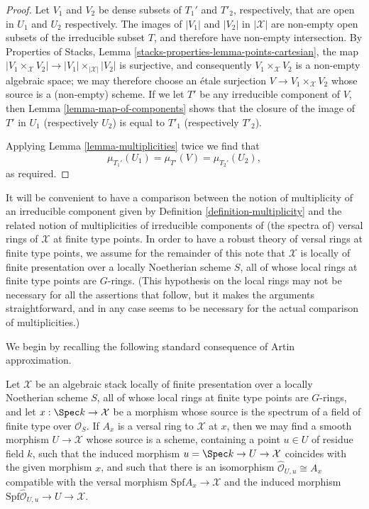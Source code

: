 \begin{proof}
Let $V_1$ and $V_2$ be dense subsets of $T_1'$ and $T'_2$, respectively,
that are open in $U_1$ and $U_2$ respectively.
The images of $|V_1|$ and $|V_2|$ in $|\mathcal{X}|$ are non-empty open
subsets of the irreducible subset $T$, and therefore have non-empty
intersection.
By Properties of Stacks, Lemma \ref{stacks-properties-lemma-points-cartesian},
the map $|V_1\times_\mathcal{X} V_2|\to
|V_1|\times_{|\mathcal{X}|}|V_2|$ is surjective,
and consequently $V_1\times_{\mathcal{X}} V_2$ is a non-empty algebraic
space; we may therefore choose an \'etale surjection
$V \to V_1\times_{\mathcal{X}} V_2$ whose source is a (non-empty) scheme.
If we let $T'$ be any irreducible component of $V$,
then Lemma \ref{lemma-map-of-components} shows that the closure of
the image of $T'$ in $U_1$ (respectively $U_2$) is equal to $T'_1$
(respectively $T'_2$).

\medskip\noindent
Applying
Lemma \ref{lemma-multiplicities} twice we find
that
$$
\mu_{T_1'}(U_1)=\mu_{T'}(V)=\mu_{T_2'}(U_2),
$$
as required.
\end{proof}

\noindent
It will be convenient to have a comparison between the notion of multiplicity
of an irreducible component given by Definition \ref{definition-multiplicity}
and the related notion of multiplicities of irreducible
components of (the spectra of) versal rings of $\mathcal{X}$ at finite type
points.
In order to have a robust theory of versal rings at finite type points,
we assume for the remainder of this note that $\mathcal{X}$ is locally
of finite presentation
over a locally Noetherian scheme $S$, all of whose local rings
at finite type points are $G$-rings.  (This hypothesis on the local rings
may not be necessary for all the assertions that follow, but it makes the
arguments straightforward, and in any case seems to be necessary
for the actual comparison of multiplicities.)

\medskip\noindent
We begin by recalling the following standard consequence of Artin approximation.

\begin{lemma}
\label{lemma-Artin-approximation-by-smooth-morphism}
Let $\mathcal{X}$ be an algebraic stack locally of finite presentation
over a locally Noetherian scheme $S$,
all of whose local rings at finite type points are $G$-rings,
and let $x: \Spec k \to \mathcal{X}$ be a morphism whose source is the spectrum
of a field of finite type over $\mathcal{O}_S$.
If $A_x$ is a versal ring to $\mathcal{X}$ at $x$, then we may find a smooth
morphism $U\to\mathcal{X}$ whose source is a scheme, containing a point
$u \in U$ of residue field $k$,
such that the induced morphism $u = \Spec k  \to U \to \mathcal{X}$
coincides with the given morphism $x$,
and such that there is an isomorphism $\widehat{\mathcal{O}}_{U,u} \cong
A_x$ compatible with the versal morphism $\text{Spf} A_x \to \mathcal{X}$
and the induced morphism
$\text{Spf} \widehat{\mathcal{O}}_{U,u} \to U \to \mathcal{X}$.
\end{lemma}

